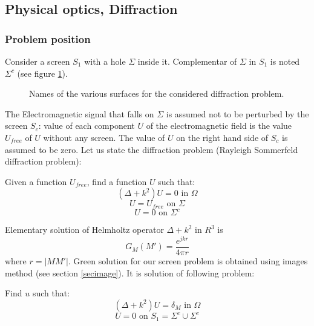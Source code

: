 \documentclass[12pt]{book}
\begin{document}
\subsection{Physical optics, Diffraction}\label{secdiffra}
\subsubsection{Problem position}
Consider a screen $S_1$ with a hole 
 $\Sigma$ inside it. Complementar of $\Sigma$ in $S_1$ is noted
$\Sigma^c$ (see figure \ref{figecran}).
\begin{figure}[htb]
 \centerline{}   
 \caption{Names of the various surfaces for the considered diffraction
   problem.} 
 \label{figecran}
\end{figure}
The Electromagnetic signal that falls on $\Sigma$ is assumed not to be
perturbed by the screen $S_c$: value of each component $U$ of the
electromagnetic field is the value $U_{free}$ of $U$ without any screen. The
value of $U$ on the right hand side of $S_c$ is assumed to be zero. Let us
state the diffraction problem \cite{ph:optic:Goodman68} (Rayleigh Sommerfeld
diffraction problem): 
\begin{prob}
Given a function $U_{free}$, find a function $U$ such that:
\begin{equation}
 (\Delta +k^2)U=0\mbox{ in  }\Omega
\end{equation}
\begin{equation}
U=U_{free} \mbox{ on  }\Sigma
\end{equation}
\begin{equation}
U=0\mbox{ on  }\Sigma^c
\end{equation}
\end{prob}
Elementary solution of Helmholtz operator $\Delta +k^2$ in $R^3$ is
\begin{equation}
G_M(M')=\frac{e^{jkr}}{4\pi r}
\end{equation}
where $r=|MM'|$.
Green solution for our screen problem is obtained using images
method (see
section \ref{secimage}). It is solution of following problem:
\begin{prob}
Find  $u$ such that:
\begin{equation}
 (\Delta +k^2)U=\delta_M\mbox{ in  }\Omega
\end{equation}
\begin{equation}
U=0\mbox{ on  }S_1=\Sigma^c\cup\Sigma^c
\end{equation}
\end{prob}
\end{document}
